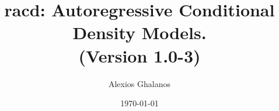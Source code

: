 \documentclass[11pt,a4paper]{article}
\begin{document}
\title{racd: Autoregressive Conditional Density Models.\\
(Version 1.0-3)}
\author{Alexios Ghalanos}
\date{\today}
\maketitle
\tableofcontents
\newpage

\clearpage

\end{document}
